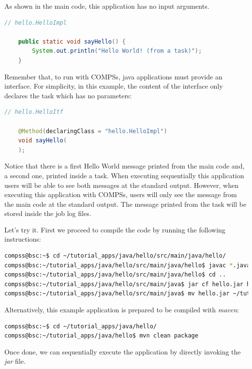 As shown in the main code, this application has no input arguments. 

\begin{lstlisting}[language=java]
	// hello.HelloImpl
	
	public static void sayHello() {
		System.out.println("Hello World! (from a task)");
	}
\end{lstlisting}

Remember that, to run with COMPSs, java applications must provide an interface. For simplicity, in this example, the content of the interface only
declares the task which has no parameters:

\begin{lstlisting}[language=java]
	// hello.HelloItf
	
	@Method(declaringClass = "hello.HelloImpl")
	void sayHello(
	);
\end{lstlisting}

Notice that there is a first Hello World message printed from the main code and, a second one, printed inside a task. When executing sequentially
this application users will be able to see both messages at the standard output. However, when executing this application with COMPSs, users will only
see the message from the main code at the standard output. The message printed from the task will be stored inside the job log files. 

Let's try it. First we proceed to compile the code by running the following instructions:

\begin{lstlisting}[language=bash]
compss@bsc:~$ cd ~/tutorial_apps/java/hello/src/main/java/hello/
compss@bsc:~/tutorial_apps/java/hello/src/main/java/hello$ javac *.java
compss@bsc:~/tutorial_apps/java/hello/src/main/java/hello$ cd ..
compss@bsc:~/tutorial_apps/java/hello/src/main/java$ jar cf hello.jar hello
compss@bsc:~/tutorial_apps/java/hello/src/main/java$ mv hello.jar ~/tutorial_apps/java/hello/jar/
\end{lstlisting}

Alternatively, this example application is prepared to be compiled with \textit{maven}:

\begin{lstlisting}[language=bash]
compss@bsc:~$ cd ~/tutorial_apps/java/hello/
compss@bsc:~/tutorial_apps/java/hello$ mvn clean package
\end{lstlisting}

Once done, we can sequentially execute the application by directly invoking the \textit{jar} file.

